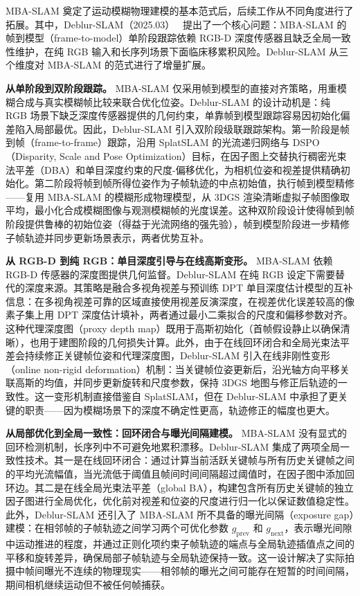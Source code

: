 MBA-SLAM 奠定了运动模糊物理建模的基本范式后，后续工作从不同角度进行了拓展。其中，Deblur-SLAM（2025.03）~\cite{2503_12572} 提出了一个核心问题：MBA-SLAM 的帧到模型（frame-to-model）单阶段跟踪依赖 RGB-D 深度传感器且缺乏全局一致性维护，在纯 RGB 输入和长序列场景下面临床移累积风险。Deblur-SLAM 从三个维度对 MBA-SLAM 的范式进行了增量扩展。

\textbf{从单阶段到双阶段跟踪。}
MBA-SLAM 仅采用帧到模型的直接对齐策略，用重模糊合成与真实模糊帧比较来联合优化位姿。Deblur-SLAM 的设计动机是：纯 RGB 场景下缺乏深度传感器提供的几何约束，单靠帧到模型跟踪容易因初始化偏差陷入局部最优。因此，Deblur-SLAM 引入双阶段级联跟踪架构。第一阶段是帧到帧（frame-to-frame）跟踪，沿用 SplatSLAM 的光流递归网络与 DSPO（Disparity, Scale and Pose Optimization）目标，在因子图上交替执行稠密光束法平差（DBA）和单目深度约束的尺度-偏移优化，为相机位姿和视差提供精确初始化。第二阶段将帧到帧所得位姿作为子帧轨迹的中点初始值，执行帧到模型精修——复用 MBA-SLAM 的模糊形成物理模型，从 3DGS 渲染清晰虚拟子帧图像取平均，最小化合成模糊图像与观测模糊帧的光度误差。这种双阶段设计使得帧到帧阶段提供鲁棒的初始位姿（得益于光流网络的强先验），帧到模型阶段进一步精修子帧轨迹并同步更新场景表示，两者优势互补。

\textbf{从 RGB-D 到纯 RGB：单目深度引导与在线高斯变形。}
MBA-SLAM 依赖 RGB-D 传感器的深度图提供几何监督。Deblur-SLAM 在纯 RGB 设定下需要替代的深度来源。其策略是融合多视角视差与预训练 DPT 单目深度估计模型的互补信息：在多视角视差可靠的区域直接使用视差反演深度，在视差优化误差较高的像素子集上用 DPT 深度估计填补，两者通过最小二乘拟合的尺度和偏移参数对齐。这种代理深度图（proxy depth map）既用于高斯初始化（首帧假设静止以确保清晰），也用于建图阶段的几何损失计算。此外，由于在线回环闭合和全局光束法平差会持续修正关键帧位姿和代理深度图，Deblur-SLAM 引入在线非刚性变形（online non-rigid deformation）机制：当关键帧位姿更新后，沿光轴方向平移关联高斯的均值，并同步更新旋转和尺度参数，保持 3DGS 地图与修正后轨迹的一致性。这一变形机制直接借鉴自 SplatSLAM，但在 Deblur-SLAM 中承担了更关键的职责——因为模糊场景下的深度不确定性更高，轨迹修正的幅度也更大。

\textbf{从局部优化到全局一致性：回环闭合与曝光间隔建模。}
MBA-SLAM 没有显式的回环检测机制，长序列中不可避免地累积漂移。Deblur-SLAM 集成了两项全局一致性技术。其一是在线回环闭合：通过计算当前活跃关键帧与所有历史关键帧之间的平均光流幅值，当光流低于阈值且帧间时间间隔超过阈值时，在因子图中添加回环边。其二是在线全局光束法平差（global BA），构建包含所有历史关键帧的独立因子图进行全局优化，优化前对视差和位姿的尺度进行归一化以保证数值稳定性。此外，Deblur-SLAM 还引入了 MBA-SLAM 所不具备的曝光间隔（exposure gap）建模：在相邻帧的子帧轨迹之间学习两个可优化参数 $g_{\mathrm{prev}}$ 和 $g_{\mathrm{next}}$，表示曝光间隙中运动推进的程度，并通过正则化项约束子帧轨迹的端点与全局轨迹插值点之间的平移和旋转差异，确保局部子帧轨迹与全局轨迹保持一致。这一设计解决了实际拍摄中帧间曝光不连续的物理现实——相邻帧的曝光之间可能存在短暂的时间间隔，期间相机继续运动但不被任何帧捕获。

